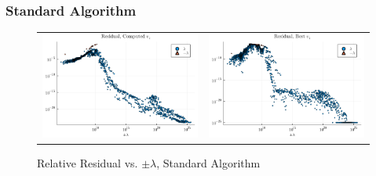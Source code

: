 \documentclass[landscape]{beamer}
\begin{document}
\begin{frame}
  \frametitle{Standard Algorithm}


  \begin{figure}
    \caption{Relative Residual vs. $\pm \lambda$, Standard Algorithm}
    \label{fig:standard}
    \vspace{1ex}
    \begin{tabular}{lr}
      \includegraphics[scale=.25]{./images/pl1_standard.png} 
      & \includegraphics[scale=.25]{./images/pl1_standard_cond.png}
    \end{tabular}
  \end{figure}
\end{frame}
\end{document}
